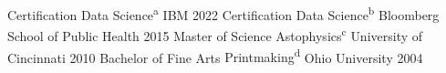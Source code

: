 \begin{cvcertificates}
  \cvcertificate
    {Certification}
    {Data Science\textsuperscript{a}}
    {IBM} %
    {2022} %
  \cvcertificate
    {Certification}
    {Data Science\textsuperscript{b}}
    {Bloomberg School of Public Health} %
    {2015} %
  \cvcertificate
    {Master of Science}
    {Astophysics\textsuperscript{c}}
    {University of Cincinnati} %
    {2010} %
\cvcertificate
  {Bachelor of Fine Arts} %
  {Printmaking\textsuperscript{d}}
  {Ohio University} %
  {2004} %
\end{cvcertificates}
